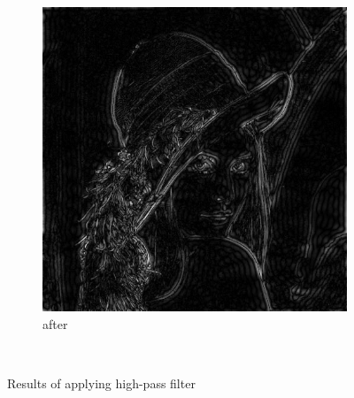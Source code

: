\documentclass[12pt]{article}
\begin{document}
\begin{figure}[H]
\begin{subfigure}[t]{\subfiguresize}
        \includegraphics[width=\textwidth]{img/lena_highpass.png}
        \caption{after}
    \end{subfigure}\\[1em]
    \caption{Results of applying high-pass filter}
\end{figure}  
\end{document}
